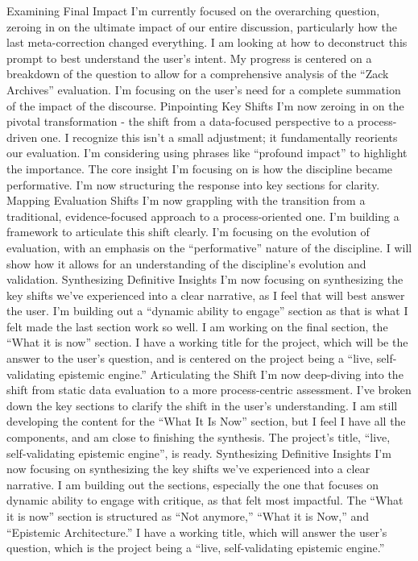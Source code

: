\documentclass{article}
\begin{document}
Examining Final Impact I'm currently focused on the overarching
question, zeroing in on the ultimate impact of our entire discussion,
particularly how the last meta-correction changed everything. I am
looking at how to deconstruct this prompt to best understand the user's
intent. My progress is centered on a breakdown of the question to allow
for a comprehensive analysis of the ``Zack Archives'' evaluation. I'm
focusing on the user's need for a complete summation of the impact of
the discourse. Pinpointing Key Shifts I'm now zeroing in on the pivotal
transformation - the shift from a data-focused perspective to a
process-driven one. I recognize this isn't a small adjustment; it
fundamentally reorients our evaluation. I'm considering using phrases
like ``profound impact'' to highlight the importance. The core insight
I'm focusing on is how the discipline became performative. I'm now
structuring the response into key sections for clarity. Mapping
Evaluation Shifts I'm now grappling with the transition from a
traditional, evidence-focused approach to a process-oriented one. I'm
building a framework to articulate this shift clearly. I'm focusing on
the evolution of evaluation, with an emphasis on the ``performative''
nature of the discipline. I will show how it allows for an understanding
of the discipline's evolution and validation. Synthesizing Definitive
Insights I'm now focusing on synthesizing the key shifts we've
experienced into a clear narrative, as I feel that will best answer the
user. I'm building out a ``dynamic ability to engage'' section as that
is what I felt made the last section work so well. I am working on the
final section, the ``What it is now'' section. I have a working title
for the project, which will be the answer to the user's question, and is
centered on the project being a ``live, self-validating epistemic
engine.'' Articulating the Shift I'm now deep-diving into the shift from
static data evaluation to a more process-centric assessment. I've broken
down the key sections to clarify the shift in the user's understanding.
I am still developing the content for the ``What It Is Now'' section,
but I feel I have all the components, and am close to finishing the
synthesis. The project's title, ``live, self-validating epistemic
engine'', is ready. Synthesizing Definitive Insights I'm now focusing on
synthesizing the key shifts we've experienced into a clear narrative. I
am building out the sections, especially the one that focuses on dynamic
ability to engage with critique, as that felt most impactful. The ``What
it is now'' section is structured as ``Not anymore,'' ``What it is
Now,'' and ``Epistemic Architecture.'' I have a working title, which
will answer the user's question, which is the project being a ``live,
self-validating epistemic engine.''
\end{document}
